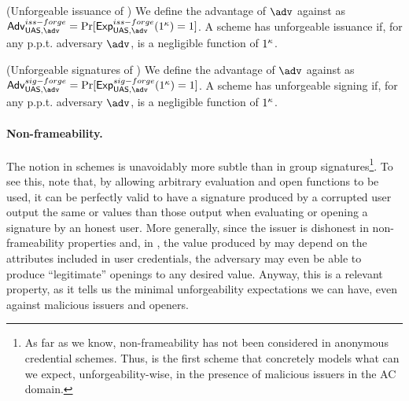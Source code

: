 \begin{definition}{(Unforgeable issuance of \UAS)}
  \label{def:issue-forge-uas}  
  We define the advantage \AdvForgeIssue of $\adv$ against \ExpForgeIssue as
  $\AdvForgeIssue=\Pr\lbrack\ExpForgeIssue(1^\secpar)=1\rbrack$.
  A \UAS scheme has unforgeable issuance if, for any p.p.t. adversary $\adv$,
  \AdvForgeIssue is a negligible function of $1^\kappa$.
\end{definition}

\begin{definition}{(Unforgeable signatures of \UAS)}
  \label{def:sign-forge-uas}  
  We define the advantage \AdvForgeSign of $\adv$ against \ExpForgeSign as
  $\AdvForgeSign=\Pr\lbrack\ExpForgeSign(1^\secpar)=1\rbrack$.
  A \UAS scheme has unforgeable signing if, for any p.p.t. adversary $\adv$,
  \AdvForgeSign is a negligible function of $1^\kappa$.
\end{definition}



\paragraph{Non-frameability.} %
The notion in \UAS schemes is unavoidably more subtle than
in group signatures\footnote{As far as we know, non-frameability has not been
  considered in anonymous credential schemes. Thus, \UAS is the first scheme
  that concretely models what can we expect, unforgeability-wise, in the
  presence of malicious issuers in the AC domain.}. To see
this, note that, by allowing arbitrary evaluation and open functions to be used,
it can be perfectly valid to have a signature produced by a corrupted user
output the same \Yeval or \yinsp values than those output when evaluating or
opening a signature by an honest user.
%
More generally, since the issuer is dishonest in non-frameability properties
and, in \UAS, the value produced by \Open may depend on the attributes
included in user credentials, the adversary may even be able to produce
``legitimate'' openings to any desired value. Anyway, this is
a relevant property, as it tells us the minimal unforgeability expectations we
can have, even against malicious issuers and openers.

